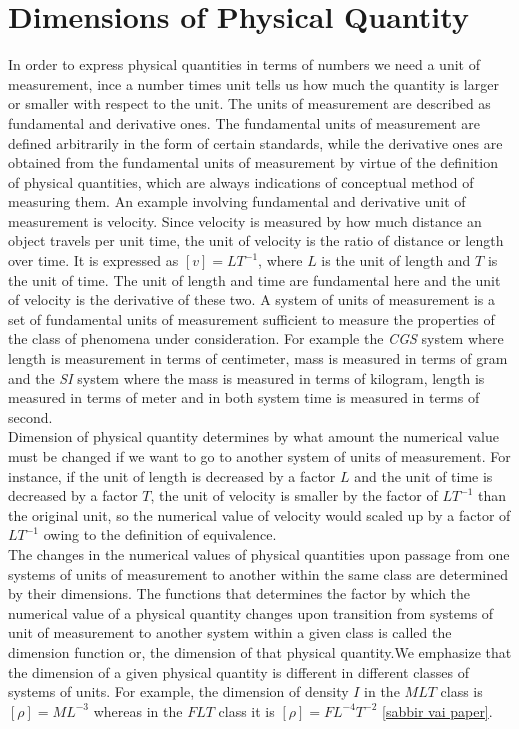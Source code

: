 \section{Dimensions of Physical Quantity}
	In order to express physical quantities in terms of numbers we need a unit of measurement, ince a number times unit tells us how much the quantity is larger or smaller with respect to the unit. The units of measurement are described as fundamental and derivative ones. The fundamental units of measurement are defined arbitrarily in the form of certain standards, while the derivative ones are obtained from the fundamental units of measurement by virtue of the definition of physical quantities, which are always indications of conceptual method of measuring them. An example involving fundamental and derivative unit of measurement is velocity. Since velocity is measured by how much distance an object travels per unit time, the unit of velocity is the ratio of distance or length over time. It is expressed as $\left[v\right] = LT^{-1}$, where $L$ is the unit of length and $T$ is the unit of time. The unit of length and time are fundamental here and the unit of velocity is the derivative of these two. A system of units of measurement is a set of fundamental units of measurement sufficient to measure the properties of the class of phenomena under consideration. For example the \textit{CGS} system where length is measurement in terms of centimeter, mass is measured in terms of gram and the \textit{SI} system where the mass is measured in terms of kilogram, length is measured in terms of meter and in both system time is measured in terms of second.\\
	Dimension of physical quantity determines by what amount the numerical value must be changed if we want to go to another system of units of measurement. For instance, if the unit of length is decreased by a factor $L$ and the unit of time is decreased by a factor $T$, the unit of velocity is smaller by the factor of $LT^{-1}$ than the original unit, so the numerical value of velocity would scaled up by a factor of $LT^{-1}$ owing to the definition of equivalence.\\
	The changes in the numerical values of physical quantities upon passage from one systems of	units of measurement to another within the same class are determined by their dimensions. The	functions that determines the factor by which the numerical value of a physical quantity changes	upon transition from systems of unit of measurement to another system within a given class is	called the dimension function or, the dimension of that physical quantity.We emphasize that the	dimension of a given physical quantity is different in different classes of systems of units. For	example, the dimension of density $I$ in the $MLT$ class is $[\rho] = ML^{-3}$ whereas in the $FLT$ class it	is $[\rho] = F L^{-4}T^{-2}$ \ref{sabbir vai paper}\cite{dimension_class_FLT}.
